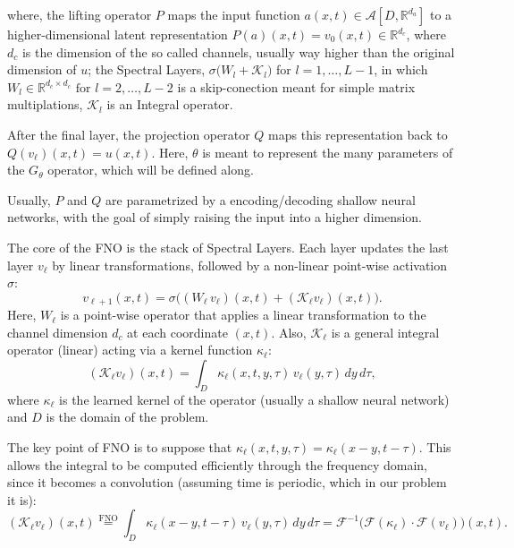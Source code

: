 \noindent where, the lifting operator $P$ maps the input function $a(x,t) \in \mathcal{A} [D, \mathbb{R}^{d_{a}} ]$ to a higher-dimensional latent representation
$P(a)(x,t) = v_0(x,t) \in \mathbb{R}^{d_c}$, where $d_c$ is the dimension of the so called channels, usually way higher than the original dimension of $u$; 
the Spectral Layers, $\sigma\Big(W_l + \mathcal{K}_l\Big)$ for $l=1, \ldots, L-1$, in which $W_l \in \mathbb{R}^{d_c \times d_c} \text{ for } l=2, \ldots, L-2$ 
is a skip-conection meant for simple matrix multiplations, $\mathcal{K}_l$ is an Integral operator.

After the final layer, the projection operator $Q$ maps this representation back to $Q(v_\ell)(x,t)= u(x,t)$. Here, $\theta$ is meant to represent the many parameters of the $G_\theta$ operator, which will be defined along.

Usually, $P$ and $Q$ are parametrized by a encoding/decoding shallow neural
networks, with the goal of simply raising the input into a higher dimension.

The core of the FNO is the stack of Spectral Layers. Each layer updates the
last layer $v_\ell$ by linear transformations, followed by a non-linear
point-wise activation $\sigma$:
\begin{equation}
    v_{\ell+1}(x,t) = \sigma \Big( (W_\ell\,v_\ell)(x,t) + (\mathcal{K}_\ell v_\ell)(x,t) \Big).
\end{equation}
Here, $W_\ell$ is a point-wise operator that applies a linear transformation to the channel dimension $d_c$ at each coordinate $(x,t)$. Also, $\mathcal{K}_\ell$ is a general integral operator (linear) acting via a kernel function $\kappa_\ell$:
\begin{equation}
    (\mathcal{K}_\ell v_\ell)(x,t) = \int_{D} \kappa_\ell(x, t, y, \tau)\,v_\ell(y,\tau)\,dy\,d\tau,
\end{equation}
where $\kappa_\ell$ is the learned kernel of the operator (usually a shallow neural network) and $D$ is the domain of the problem.

The key point of FNO is to suppose that $\kappa_\ell(x, t, y,
    \tau)=\kappa_\ell(x - y, t - \tau)$. This allows the integral to be computed
efficiently through the frequency domain, since it becomes a convolution
(assuming time is periodic, which in our problem it is):
\begin{equation}
    (\mathcal{K}_\ell v_\ell)(x,t) \overset{\text{FNO}}{=} \int_{D} \kappa_\ell(x - y, t - \tau)\,v_\ell(y,\tau)\,dy\,d\tau = \mathcal{F}^{-1} \Big( \mathcal{F}(\kappa_\ell) \cdot \mathcal{F}(v_\ell) \Big)(x,t).
    \label{eq:fno_approximation}
\end{equation}

